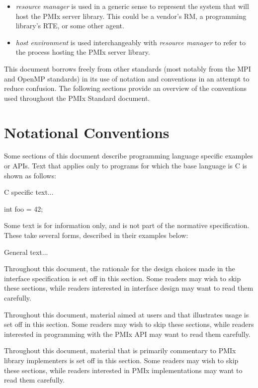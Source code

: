 \begin{itemize}
\item \emph{resource manager} is used in a generic sense to represent the system that will host the \ac{PMIx} server library. This could be a vendor's \ac{RM}, a programming library's \ac{RTE}, or some other agent.
\item \emph{host environment} is used interchangeably with \emph{resource manager} to refer to the process hosting the \ac{PMIx} server library.
\end{itemize}


This document borrows freely from other standards (most notably from the \ac{MPI} and OpenMP standards) in its use of notation and conventions in an attempt to reduce confusion. The following sections provide an overview of the conventions used throughout the \ac{PMIx} Standard document.

\section{Notational Conventions}

Some sections of this document describe programming language specific examples or \acp{API}.
Text that applies only to programs for which the base language is C is shown as follows:

\cspecificstart
C specific text...
\begin{codepar}
int foo = 42;
\end{codepar}
\cspecificend

Some text is for information only, and is not part of the normative specification.
These take several forms, described in their examples below:

\notestart
\noteheader
General text...
\noteend

\rationalestart
Throughout this document, the rationale for the design choices made in the interface specification is set off in this section.
Some readers may wish to skip these sections, while readers interested in interface design may want to read them carefully.
\rationaleend

\adviceuserstart
Throughout this document, material aimed at users and that illustrates usage is set off in this section.
Some readers may wish to skip these sections, while readers interested in programming with the \ac{PMIx} \ac{API} may want to read them carefully.
\adviceuserend

\adviceimplstart
Throughout this document, material that is primarily commentary to \ac{PMIx} library implementers is set off in this section.
Some readers may wish to skip these sections, while readers interested in \ac{PMIx} implementations may want to read them carefully.
\adviceimplend

